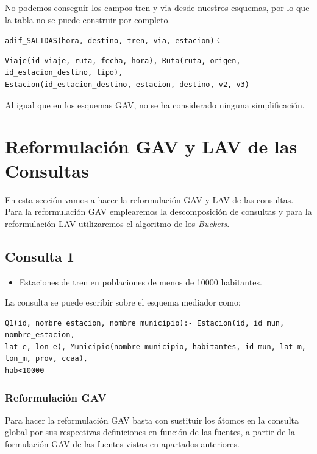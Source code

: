 No podemos conseguir los campos tren y via desde nuestros esquemas, por
lo que la tabla no se puede construir por completo.

\texttt{adif\_SALIDAS(hora,\ destino,\ tren,\ via,\ estacion)}\(\subseteq\)

\begin{verbatim}
Viaje(id_viaje, ruta, fecha, hora), Ruta(ruta, origen, id_estacion_destino, tipo), 
Estacion(id_estacion_destino, estacion, destino, v2, v3)
\end{verbatim}

Al igual que en los esquemas GAV, no se ha considerado ninguna
simplificación.

\section{Reformulación GAV y LAV de las
Consultas}\label{reformulaciuxf3n-gav-y-lav-de-las-consultas}

En esta sección vamos a hacer la reformulación GAV y LAV de las
consultas. Para la reformulación GAV emplearemos la descomposición de
consultas y para la reformulación LAV utilizaremos el algoritmo de los
\emph{Buckets}.

\subsection{Consulta 1}\label{consulta-1}

\begin{itemize}
\tightlist
\item
  Estaciones de tren en poblaciones de menos de 10000 habitantes.
\end{itemize}

La consulta se puede escribir sobre el esquema mediador como:

\begin{verbatim}
Q1(id, nombre_estacion, nombre_municipio):- Estacion(id, id_mun, nombre_estacion, 
lat_e, lon_e), Municipio(nombre_municipio, habitantes, id_mun, lat_m, lon_m, prov, ccaa), 
hab<10000
\end{verbatim}

\subsubsection{Reformulación GAV}\label{reformulaciuxf3n-gav}

Para hacer la reformulación GAV basta con sustituir los átomos en la
consulta global por sus respectivas definiciones en función de las
fuentes, a partir de la formulación GAV de las fuentes vistas en
apartados anteriores.

